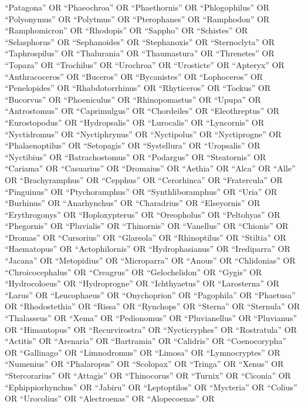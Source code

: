 \documentclass[
  number,
  review,
  onecolumn]{elsarticle}
\begin{document}
``Patagona'' OR ``Phaeochroa'' OR ``Phaethornis'' OR ``Phlogophilus'' OR
``Polyonymus'' OR ``Polytmus'' OR ``Pterophanes'' OR ``Ramphodon'' OR
``Ramphomicron'' OR ``Rhodopis'' OR ``Sappho'' OR ``Schistes'' OR
``Selasphorus'' OR ``Sephanoides'' OR ``Stephanoxis'' OR ``Sternoclyta''
OR ``Taphrospilus'' OR ``Thalurania'' OR ``Thaumastura'' OR
``Threnetes'' OR ``Topaza'' OR ``Trochilus'' OR ``Urochroa'' OR
``Urosticte'' OR ``Apteryx'' OR ``Anthracoceros'' OR ``Buceros'' OR
``Bycanistes'' OR ``Lophoceros'' OR ``Penelopides'' OR
``Rhabdotorrhinus'' OR ``Rhyticeros'' OR ``Tockus'' OR ``Bucorvus'' OR
``Phoeniculus'' OR ``Rhinopomastus'' OR ``Upupa'' OR ``Antrostomus'' OR
``Caprimulgus'' OR ``Chordeiles'' OR ``Eleothreptus'' OR
``Eurostopodus'' OR ``Hydropsalis'' OR ``Lurocalis'' OR ``Lyncornis'' OR
``Nyctidromus'' OR ``Nyctiphrynus'' OR ``Nyctipolus'' OR ``Nyctiprogne''
OR ``Phalaenoptilus'' OR ``Setopagis'' OR ``Systellura'' OR
``Uropsalis'' OR ``Nyctibius'' OR ``Batrachostomus'' OR ``Podargus'' OR
``Steatornis'' OR ``Cariama'' OR ``Casuarius'' OR ``Dromaius'' OR
``Aethia'' OR ``Alca'' OR ``Alle'' OR ``Brachyramphus'' OR ``Cepphus''
OR ``Cerorhinca'' OR ``Fratercula'' OR ``Pinguinus'' OR
``Ptychoramphus'' OR ``Synthliboramphus'' OR ``Uria'' OR ``Burhinus'' OR
``Anarhynchus'' OR ``Charadrius'' OR ``Elseyornis'' OR ``Erythrogonys''
OR ``Hoploxypterus'' OR ``Oreopholus'' OR ``Peltohyas'' OR ``Phegornis''
OR ``Pluvialis'' OR ``Thinornis'' OR ``Vanellus'' OR ``Chionis'' OR
``Dromas'' OR ``Cursorius'' OR ``Glareola'' OR ``Rhinoptilus'' OR
``Stiltia'' OR ``Haematopus'' OR ``Actophilornis'' OR ``Hydrophasianus''
OR ``Irediparra'' OR ``Jacana'' OR ``Metopidius'' OR ``Microparra'' OR
``Anous'' OR ``Chlidonias'' OR ``Chroicocephalus'' OR ``Creagrus'' OR
``Gelochelidon'' OR ``Gygis'' OR ``Hydrocoloeus'' OR ``Hydroprogne'' OR
``Ichthyaetus'' OR ``Larosterna'' OR ``Larus'' OR ``Leucophaeus'' OR
``Onychoprion'' OR ``Pagophila'' OR ``Phaetusa'' OR ``Rhodostethia'' OR
``Rissa'' OR ``Rynchops'' OR ``Sterna'' OR ``Sternula'' OR
``Thalasseus'' OR ``Xema'' OR ``Pedionomus'' OR ``Pluvianellus'' OR
``Pluvianus'' OR ``Himantopus'' OR ``Recurvirostra'' OR ``Nycticryphes''
OR ``Rostratula'' OR ``Actitis'' OR ``Arenaria'' OR ``Bartramia'' OR
``Calidris'' OR ``Coenocorypha'' OR ``Gallinago'' OR ``Limnodromus'' OR
``Limosa'' OR ``Lymnocryptes'' OR ``Numenius'' OR ``Phalaropus'' OR
``Scolopax'' OR ``Tringa'' OR ``Xenus'' OR ``Stercorarius'' OR
``Attagis'' OR ``Thinocorus'' OR ``Turnix'' OR ``Ciconia'' OR
``Ephippiorhynchus'' OR ``Jabiru'' OR ``Leptoptilos'' OR ``Mycteria'' OR
``Colius'' OR ``Urocolius'' OR ``Alectroenas'' OR ``Alopecoenas'' OR
\end{document}
